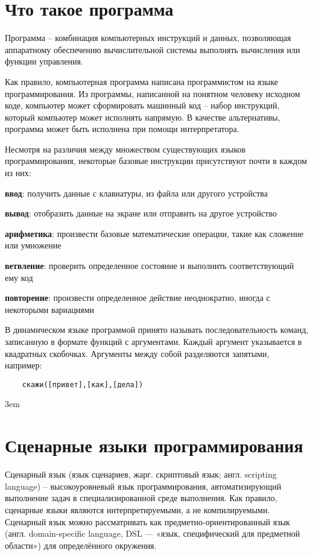 \documentclass[../index.tex]{subfiles}
\begin{document}
\section{Что такое программа}

    Программа -- комбинация компьютерных инструкций и данных, позволяющая аппаратному обеспечению вычислительной системы выполнять вычисления или функции управления. 
    
    Как правило, компьютерная программа написана программистом на языке программирования. Из программы, написанной на понятном человеку исходном коде, компьютер может сформировать машинный код -- набор инструкций, который компьютер может исполнять напрямую. В качестве альтернативы, программа может быть исполнена при помощи интерпретатора.
    
    Несмотря на различия между множеством существующих языков программирования, некоторые базовые инструкции присутствуют почти в каждом из них:
    
    \textbf{ввод}: получить данные с клавиатуры, из файла или другого устройства
    
    \textbf{вывод}: отобразить данные на экране или отправить на другое устройство
    
    \textbf{арифметика}: произвести базовые математические операции, такие как сложение или умножение
    
    \textbf{ветвление}: проверить определенное состояние и выполнить соответствующий ему код
    
    \textbf{повторение}: произвести определенное действие неоднократно, иногда с некоторыми вариациями
        
        
    В динамическом языке программой принято называть последовательность команд, записанную в формате функций с аргументами.
    Каждый аргумент указывается в квадратных скобочках. Аргументы между собой разделяются запятыми, например: 
    \begin{verbatim}
    скажи([привет],[как],[дела])
    \end{verbatim}
    
     \emergencystretch 3em
    \section{Сценарные языки программирования}
        Сценарный язык (язык сценариев, жарг. скриптовый язык; англ. scripting language) -- высокоуровневый язык программирования, автоматизирующий выполнение задач в специализированной среде выполнения. 
        Как правило, сценарные языки являются интерпретируемыми, а не компилируемыми. Сценарный язык 
        можно рассматривать как предметно-ориентированный язык (англ. domain-specific language, DSL — «язык, специфический для предметной области») для определённого окружения.
        
\end{document}
